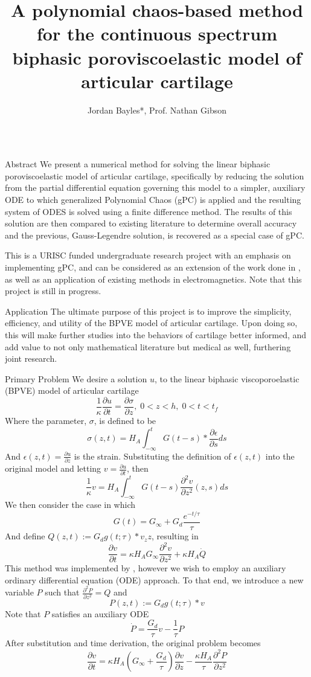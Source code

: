 \documentclass[final]{beamer} %
\title{A polynomial chaos-based method for the continuous spectrum biphasic poroviscoelastic model of articular cartilage}
\author[*baylesj@onid.orst.edu]{Jordan Bayles*, Prof. Nathan Gibson}
\institute[Department of Mathematics, Oregon State University]{Department of Mathematics, Oregon State University}
\newcommand{\pd}[2]{\frac{\partial#1}{\partial#2}}
\begin{document}
\begin{frame}[t]

\begin{columns}[t]
\begin{column}{0.28\paperwidth}

\begin{alertblock}{Abstract}
We present a numerical method for solving the linear biphasic poroviscoelastic
model of articular cartilage, specifically by reducing the solution from the
partial differential equation governing this model to a simpler, auxiliary ODE
to which generalized Polynomial Chaos (gPC) is applied and the resulting system of
ODES is solved using a finite difference method. The results of this solution
are then compared to existing literature to determine overall accuracy and
the previous, Gauss-Legendre solution, is recovered as a special case of gPC.

\end{alertblock}
This is a URISC funded undergraduate research project with an emphasis on implementing
gPC, and can be considered as an extension of the work done in \cite{stuebner},
\cite{schugart} as well as an application of existing methods in electromagnetics. 
Note that this project is still in progress.

\begin{block}{Application}
The ultimate purpose of this project is to improve the simplicity, efficiency, and
utility of the BPVE model of articular cartilage. Upon doing so, this will make further
studies into the behaviors of cartilage better informed, and add value to not only
mathematical literature but medical as well, furthering joint research.
\end{block}

\begin{block}{Primary Problem}
We desire a solution $u$, to the linear biphasic viscoporoelastic (BPVE) model
of articular cartilage
\[
\frac{1}{\kappa} \pd{u}{t} = \pd{\sigma}{z},\; 0<z<h,\; 0<t<t_f
\]
Where the parameter, $\sigma$, is defined to be
\[
\sigma(z,t) = H_A \int_{-\infty}^{t} G(t-s) * \pd{\epsilon}{s} ds
\]
And $\epsilon(z,t) = \pd{u}{z}$ is the strain. Substituting the definition of
$\epsilon(z,t)$ into the original model and letting $v=\pd{u}{t}$, then
\[
\frac{1}{\kappa} v = H_A \int_{-\infty}^{t}G(t-s) \pd{^2 v}{z^2} (z, s) ds
\]
We then consider the case in which
\[
G(t) = G_{\infty} + G_d \frac{e^{-t/\tau}}{\tau}
\]
And define $Q(z,t) := G_d g(t; \tau) * v_zz$, resulting in
\[
\pd{v}{t} = \kappa H_A G_{\infty} \pd{^2 v}{z^2} + \kappa H_A \dot{Q}
\]
This method was implemented by \cite{schugart}, \cite{stuebner} however we
wish to employ an auxiliary ordinary differential equation (ODE) approach. To that end,
we introduce a new variable $P$ such that $\pd{^2 P}{z^2} = Q$ and
\[
P(z, t) := G_d g(t; \tau) * v
\]
Note that $P$ satisfies an auxiliary ODE
\[
\dot{P} = \frac{G_d}{\tau} v - \frac{1}{\tau} P
\]
After substitution and time derivation, the original problem becomes
\[
\pd{v}{t} = \kappa H_A (G_{\infty} + \frac{G_d}{\tau}) \pd{v}{z} - 
\frac{\kappa H_A}{\tau} \pd{^2 P}{z^2}
\]
\end{block}


\end{column}
\end{columns}
\end{frame}
\end{document}
